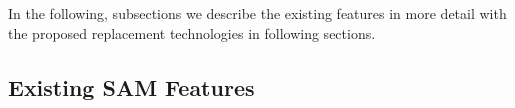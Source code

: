 \documentclass[../main-v1.tex]{subfiles}
\begin{document}


 






In the following, subsections we describe the existing features in more detail with the proposed replacement technologies in following sections. 

\subsection{Existing SAM  Features}
\end{document}

